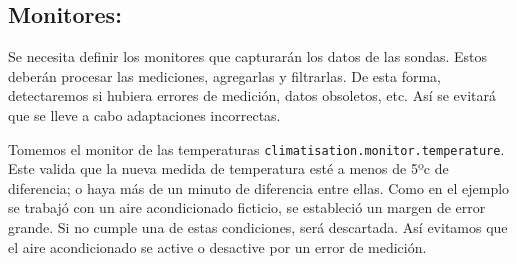 \subsection{Monitores:}

Se necesita definir los monitores que capturarán los datos de las sondas. Estos deberán procesar las mediciones, agregarlas y filtrarlas. De esta forma, detectaremos si hubiera errores de medición, datos obsoletos, etc. Así se evitará que se lleve a cabo adaptaciones incorrectas.

Tomemos el monitor de las temperaturas \texttt{climatisation.monitor.temperature}. Este valida que la nueva medida de temperatura esté a menos de 5ºc de diferencia; o haya más de un minuto de diferencia entre ellas. Como en el ejemplo se trabajó con un aire acondicionado ficticio, se estableció un margen de error grande. Si no cumple una de estas condiciones, será descartada. Así evitamos que el aire acondicionado se active o desactive por un error de medición.

